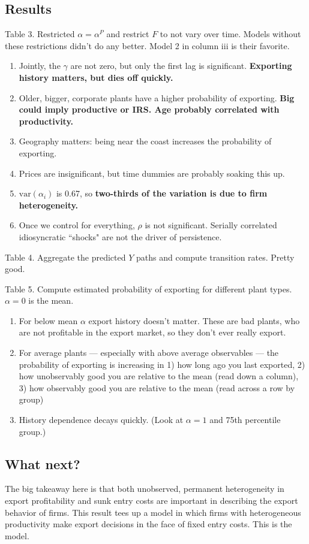 \documentclass[11pt, pdftex]{article}
\newcommand{\var}{\mathrm{var}}
\begin{document}
\subsection*{Results}
Table 3.  Restricted $\alpha=\alpha^P$ and restrict $F$ to not vary over time.  Models without these restrictions didn't do any better.   Model 2 in column iii is their favorite.
\begin{enumerate}
  \item Jointly, the $\gamma$ are not zero, but only the first lag is significant. \textbf{Exporting history matters, but dies off quickly.}
  \item Older, bigger, corporate plants have a higher probability of exporting. \textbf{Big could imply productive or IRS.  Age probably correlated with productivity.}
  \item Geography matters: being near the coast increases the probability of exporting.
  \item Prices are insignificant, but time dummies are probably soaking this up.
  \item $\var(\alpha_i)$ is 0.67, so \textbf{ two-thirds of the variation is due to firm heterogeneity.}
  \item Once we control for everything, $\rho$ is not significant.  Serially correlated idiosyncratic ``shocks" are not the driver of persistence.
\end{enumerate}

Table 4.  Aggregate the predicted $Y$ paths and compute transition rates.  Pretty good.

Table 5.  Compute estimated probability of exporting for different plant types.  $\alpha=0$ is the mean.

\begin{enumerate}
  \item For below mean $\alpha$ export history doesn't matter.  These are bad plants, who are not profitable in the export market, so they don't ever really export.
  \item For average plants --- especially with above average observables --- the probability of exporting is increasing in 1) how long ago you last exported, 2) how unobservably good you are relative to the mean (read down a column), 3) how observably good you are relative to the mean (read across a row by group)
  \item History dependence decays quickly. (Look at $\alpha=1$ and 75th percentile group.)
\end{enumerate}

\subsection*{What next?}
The big takeaway here is that both unobserved, permanent heterogeneity in export profitability and sunk entry costs are important in describing the export behavior of firms.  This result tees up a model in which firms with heterogeneous productivity make export decisions in the face of fixed entry costs.  This is the \citet{melitz} model.

\setlength{\parskip}{0.0cm}
\printbibliography
\end{document}
